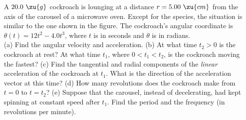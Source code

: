A $20.0\ \zu{g}$ cockroach is lounging at a distance $r=5.00\ \zu{cm}$
from the axis of the carousel of a microwave oven. Except for the species, the situation is similar
to the one shown in the figure. The cockroach's
angular coordinate is
$\theta(t) = 12t^2 - 4.0t^3$, where $t$ is in seconds and
$\theta$ is in radians.\\
%
(a) Find the angular velocity and acceleration.\answercheck\hwendpart
%
(b) At what time $t_2 > 0$ is the cockroach at rest? At what time
$t_1$, where $0 < t_1 < t_2$, is the cockroach moving the fastest?\answercheck\hwendpart
%
(c) Find the tangential and radial components of the \emph{linear}
acceleration of the cockroach at $t_1$. What is the direction of
the acceleration vector at this time?\answercheck\hwendpart
%
(d) How many revolutions does the cockroach make from $t=0$ to $t =
t_2$?\answercheck\hwendpart
%
(e) Suppose that the carousel, instead of decelerating, had kept spinning at
constant speed after $t_1$. Find the period and the frequency (in revolutions per minute).\answercheck

